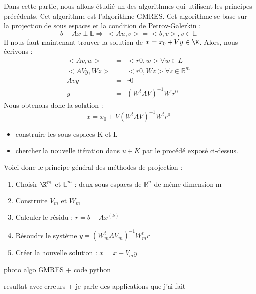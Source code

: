 \documentclass[12pt]{beamer}
\begin{document}
\begin{frame}
    Dans cette partie, nous allons étudié un des algorithmes qui utilisent les principes précédents. Cet algorithme est l'algorithme GMRES. 
    Cet algorithme se base sur la projection de sous espaces et la condition de Petrov-Galerkin :
    \begin{equation}
        b - Ax \perp \mathbb{L} \Rightarrow \ <Au, v> = <b, v>, v \in \mathbb{L}
        \label{Petrov-Galerkin}
    \end{equation}
    Il nous faut maintenant trouver la solution de $ x = x_0 + Vy \in \K$. Alors, nous écrivons : 
    \begin{eqnarray}
    <Av, w> &=& <r0, w> \forall w \in L\\
    <AVy, Wz> &=& <r0, Wz> \forall z \in \mathbb{R}^m \\
    Avy &=& r0 \\
    y &=& (W^t A V)^{-1} W^tr^0
    \end{eqnarray}
    Nous obtenons donc la solution : 
    \begin{equation}
    x = x_0 + V (W^t A V)^{-1} W^tr^0
    \end{equation}
\end{frame}
\begin{frame}
    \begin{itemize}
        \item construire les sous-espaces K et L
        \item chercher la nouvelle itération dans $u + K$ par le procédé exposé ci-dessus.
    \end{itemize}
    Voici donc le principe général des méthodes de projection : 
    \begin{enumerate}
        \item Choisir $\K^m$ et $\mathbb{L}^m$ : deux sous-espaces de $\mathbb{R}^n$ de même dimension m
        \item Construire $V_m$ et $W_m$
        \item Calculer le résidu : $r = b - Ax^{(k)}$
        \item Résoudre le système $y = (W^t_m A V_m)^{-1} W^t_mr$
        \item Créer la nouvelle solution : $x = x + V_m y$
    \end{enumerate}
\end{frame}
\begin{frame}
    photo algo GMRES + code python
\end{frame}
\begin{frame}
    resultat avec erreurs + je parle des applications que j'ai fait
\end{frame}
\end{document}
